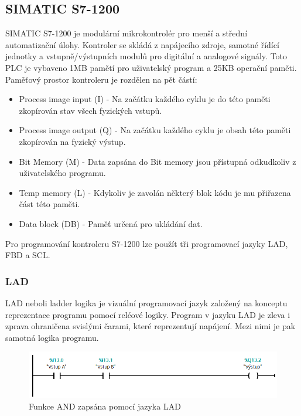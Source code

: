 \documentclass[a4paper,12pt,czech,bibliography=totoc]{scrbook}
\begin{document}
\subsection{SIMATIC S7-1200}
SIMATIC S7-1200 je modulární mikrokontrolér pro menší a střední automatizační úlohy. Kontroler se skládá z napájecího zdroje, samotné řídící jednotky a vstupně/výstupních modulů pro digitální a analogové signály. Toto PLC je vybaveno 1MB pamětí pro uživatelský program a 25KB operační paměti.
\newline
Paměťový prostor kontroleru je rozdělen na pět částí:
\begin{itemize}
	\item Process image input (I) - Na začátku každého cyklu je do této paměti zkopírován stav všech fyzických vstupů.\\
	\item Process image output (Q) - Na začátku každého cyklu je obsah této paměti zkopírován na fyzický výstup.\\
	\item Bit Memory (M) - Data zapsána do Bit memory jsou přístupná odkudkoliv z uživatelského programu. \\
	\item Temp memory (L) - Kdykoliv je zavolán některý blok kódu je mu přiřazena část této paměti.\\
	\item Data block (DB) - Paměť určená pro ukládání dat. \\
\end{itemize}
Pro programování kontroleru S7-1200 lze použít tři programovací jazyky LAD, FBD a SCL.
\cite{Stenerson2015}
\subsubsection*{LAD}
	LAD neboli ladder logika je vizuální programovací jazyk založený na konceptu reprezentace programu pomocí reléové logiky.  Program v jazyku LAD je zleva i zprava ohraničena svislými čarami, které reprezentují napájení. Mezi nimi je pak samotná logika programu.
	\begin{figure}[h]
		\centering
		\includegraphics[scale = 0.6]{LAD_AND.PNG}
		\caption{Funkce AND zapsána pomocí jazyka LAD}
		\label{fig:my_label}
	\end{figure}
\end{document}

